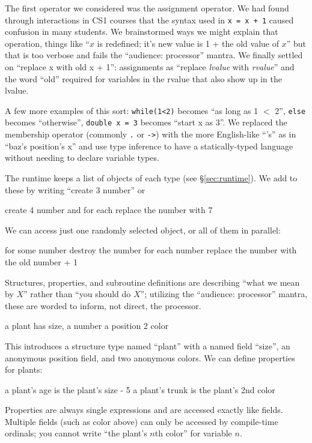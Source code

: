 \documentclass{sig-alternate}
\newcommand{\INDSTATE}[1][1]{\STATE\hspace{#1\algorithmicindent}}
\newenvironment{snippet}{\begin{algorithmic}[1]}{\end{algorithmic}}
\begin{document}
The first operator we considered was the assignment operator.
We had found through interactions in CS1 courses
that the syntax used in \texttt{x = x + 1} caused confusion in many students.
We brainstormed ways we might explain that operation,
things like ``$x$ is redefined; it's new value is 1 + the old value of $x$''
but that is too verbose and fails the ``audience: processor'' mantra.
We finally settled on ``replace x with old x + 1'':
assignments as ``replace \emph{lvalue} with \emph{rvalue}''
and the word ``old'' required for variables in the rvalue that also show up in the lvalue.

A few more examples of this sort:
\texttt{while(1<2)} becomes ``as long as 1 $<$ 2'',
\texttt{else} becomes ``otherwise'',
\texttt{double x = 3} becomes ``start x as 3''.
We replaced the membership operator (commonly \texttt{.} or \texttt{->})
with the more English-like ``'s'' as in ``baz's position's x''
and use type inference to have a statically-typed language 
without needing to declare variable types.

The runtime keeps a list of objects of each type (see \S\ref{sec:runtime}).
We add to these by writing ``create 3 number'' or 
\begin{snippet}
\STATE create 4 number and for each 
\INDSTATE replace the number with 7
\end{snippet}
We can access just one randomly selected object, or all of them in parallel:
\begin{snippet}
\STATE for some number
\INDSTATE destroy the number
\STATE for each number
\INDSTATE replace the number with the old number + 1
\end{snippet}

Structures, properties, and subroutine definitions
are describing ``what we mean by $X$''
rather than ``you should do $X$'';
utilizing the ``audience: processor'' mantra, these are worded 
to inform, not direct, the processor.
\begin{snippet}
\STATE a plant has
\INDSTATE size, a number
\INDSTATE a position
\INDSTATE 2 color
\end{snippet}
This introduces a structure type named ``plant''
with a named field ``size'', an anonymous position field, and two anonymous colors.
We can define properties for plants:
\begin{snippet}
\STATE a plant's age is the plant's size - 5
\STATE a plant's trunk is the plant's 2nd color
\end{snippet}
Properties are always single expressions and are accessed exactly like fields.
Multiple fields (such as color above) can only be accessed by compile-time ordinals;
you cannot write ``the plant's $n$th color'' for variable $n$.
\end{document}

